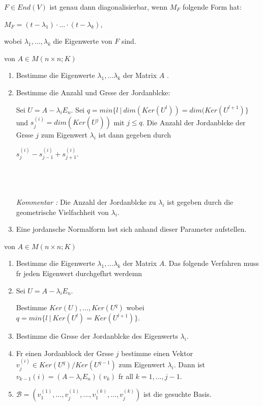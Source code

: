 \documentclass[11pt, a4paper]{article}
\begin{document}
\begin{corollary}
$F \in End(V)$ ist genau dann diagonalisierbar, wenn $M_F$ folgende Form hat:
\\ \centerline{$M_F = (t - \lambda_1) \cdot ... \cdot (t - \lambda_k)$,}
wobei $\lambda_1, ... , \lambda_k$ die Eigenwerte von $F$ sind.
\end{corollary}

\begin{remark}
 von $A \in M(n \times n; K)$
\begin{enumerate}
\item Bestimme die Eigenwerte $\lambda_1, ... \lambda_k$ der Matrix $A$ .
\item Bestimme die Anzahl und Gr\oee sse der Jordanbl\oee cke:

Sei $U = A - \lambda_i E_n$.
Sei $q= min\{l \ | \ dim(Ker(U^l)) = dim(Ker(U^{l+1})\}$ und $s_j^{(i)} = dim(Ker(U^j))$ mit $j \leq q$.
Die Anzahl der Jordanbl\oee cke der Gr\oee sse $j$ zum Eigenwert $\lambda_i$ ist dann gegeben durch 
\\ \centerline{$s_j^{(i)} - s_{j-1}^{(i)} +s_{j+1}^{(i)}.$}
\\
\\
\\ \textit{Kommentar :} Die Anzahl der Jordanbl\oee cke zu $\lambda_i$ ist gegeben durch die geometrische Vielfachheit von $\lambda_i$.
\item Eine jordansche Normalform l\aee sst sich anhand dieser Parameter aufstellen.
\end{enumerate}
\end{remark}

\begin{remark}
 von $A \in M(n \times n; K)$
\begin{enumerate}
\item Bestimme die Eigenwerte $\lambda_1, ... \lambda_k$ der Matrix $A$. Das folgende Verfahren muss f\uee r jeden Eigenwert durchgef\uee hrt werdemn
\item Sei $U = A - \lambda_i E_n$.

Bestimme $Ker(U), ..., Ker(U^q)$ wobei $q= min\{l \ | \ Ker(U^l) = Ker(U^{l+1})\}$. 
\item Bestimme die Gr\oee sse der Jordanbl\oee cke des Eigenwerts $\lambda_i$.
\item F\uee r einen Jordanblock der Gr\oee sse $j$ bestimme einen Vektor $v_j^{(i)} \in Ker(U^q) / Ker(U^{q-1})$ zum Eigenwert $\lambda_i$. Dann ist $v_{k-1}{(i)} = (A - \lambda_i E_n)(v_k) $ f\uee r all $k = 1, ..., j-1.$
\item $\mathcal{B} = (v_1^{(1)}, ..., v_j^{(1)}, ..., v_1^{(k)}, ..., v_j^{(k)})$ ist die gesuchte Basis.

\end{enumerate}
\end{remark}
\end{document}
